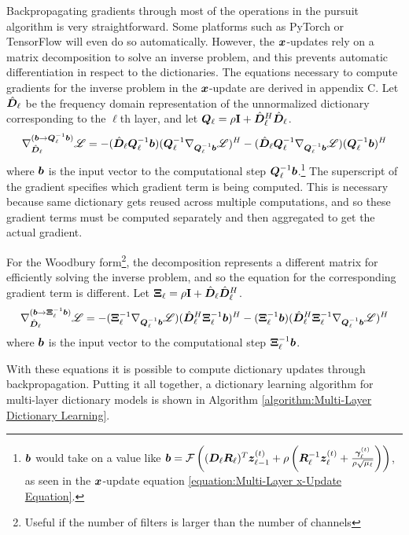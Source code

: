 Backpropagating gradients through most of the operations in the pursuit algorithm is very straightforward. Some platforms such as PyTorch \cite{paszke2017automatic} or TensorFlow \cite{tensorflow} will even do so automatically. However, the $\bm{x}$-updates rely on a matrix decomposition to solve an inverse problem, and this prevents automatic differentiation in respect to the dictionaries. The equations necessary to compute gradients for the inverse problem in the $\bm{x}$-update are derived in appendix C.
Let $\hat{\bm{D}}_{\ell}$ be the frequency domain representation of the unnormalized dictionary corresponding to the $\ell$th layer, and let $\bm{Q}_{\ell} = \rho{\bf I} + \hat{\bm{D}}_{\ell}^H\hat{\bm{D}}_{\ell}$.
\begin{equation}
\nabla_{\hat{\bm{D}}_{\ell}}^{(\bm{b} \rightarrow \bm{Q}_{\ell}^{-1}\bm{b})} \mathscr{L} = -(\hat{\bm{D}}_{\ell}\bm{Q}_{\ell}^{-1}\bm{b})(\bm{Q}_{\ell}^{-1}\nabla_{\bm{Q}_{\ell}^{-1}\bm{b}} \mathscr{L})^H - (\hat{\bm{D}}_{\ell}\bm{Q}_{\ell}^{-1}\nabla_{\bm{Q}_{\ell}^{-1}\bm{b}} \mathscr{L}) (\bm{Q}_{\ell}^{-1}\bm{b})^H
\end{equation}
where $\bm{b}$ is the input vector to the computational step $\bm{Q}_{\ell}^{-1}\bm{b}$.\footnote{$\bm{b}$ would take on a value like $\bm{b} = \mathcal{F}\left((\bm{D}_{\ell}\bm{R}_{\ell})^T\bm{z}_{\ell - 1}^{(t)} + \rho \left(\bm{R}_{\ell}^{-1}\bm{z}_{\ell}^{(t)} + \frac{\bm{\gamma}_{\ell}^{(t)}}{\rho\sqrt{\mu_{\ell}}}\right)\right) $, as seen in the $\bm{x}$-update equation \ref{equation:Multi-Layer x-Update Equation}.} The superscript of the gradient specifies which gradient term is being computed. This is necessary because same dictionary gets reused across multiple computations, and so these gradient terms must be computed separately and then aggregated to get the actual gradient.

For the Woodbury form\footnote{Useful if the number of filters is larger than the number of channels}, the decomposition represents a different matrix for efficiently solving the inverse problem, and so the equation for the corresponding gradient term is different.
Let $\bm{\Xi}_{\ell} = \rho{\bf I} + \hat{\bm{D}}_{\ell}\hat{\bm{D}}_{\ell}^H$.
\begin{equation}
\nabla_{\hat{\bm{D}}_{\ell}}^{(\bm{b} \rightarrow \bm{\Xi}_{\ell}^{-1}\bm{b})} \mathscr{L} = -(\bm{\Xi}_{\ell}^{-1}\nabla_{\bm{Q}_{\ell}^{-1}\bm{b}} \mathscr{L})(\hat{\bm{D}}_{\ell}^H\bm{\Xi}_{\ell}^{-1}\bm{b})^H -  (\bm{\Xi}_{\ell}^{-1}\bm{b})(\hat{\bm{D}}_{\ell}^H\bm{\Xi}_{\ell}^{-1}\nabla_{\bm{Q}_{\ell}^{-1}\bm{b}} \mathscr{L})^H
\end{equation}
where $\bm{b}$ is the input vector to the computational step $\bm{\Xi}_{\ell}^{-1}\bm{b}$.

With these equations it is possible to compute dictionary updates through backpropagation.  Putting it all together, a dictionary learning algorithm for multi-layer dictionary models is shown in Algorithm \ref{algorithm:Multi-Layer Dictionary Learning}.


